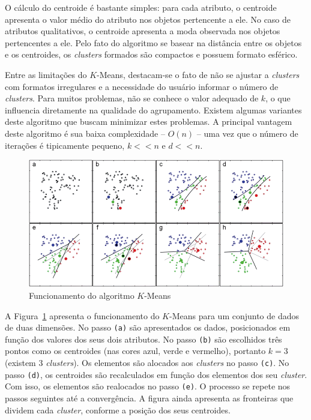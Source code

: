 O cálculo do centroide é bastante simples: para cada atributo, o centroide apresenta o valor médio do atributo nos objetos pertencente a ele. No caso de atributos qualitativos, o centroide apresenta a moda observada nos objetos pertencentes a ele. Pelo fato do algoritmo se basear na distância entre os objetos e os centroides, os \textit{clusters} formados são compactos e possuem formato esférico.

Entre as limitações do $K$-Means, destacam-se o fato de não se ajustar a \textit{clusters} com formatos irregulares e a necessidade do usuário informar o número de \textit{clusters}. Para muitos problemas, não se conhece o valor adequado de $k$, o que influencia diretamente na qualidade do agrupamento. Existem algumas variantes deste algoritmo que buscam minimizar estes problemas. A principal vantagem deste algoritmo é sua baixa complexidade -- $O(n)$ -- uma vez que o número de iterações é tipicamente pequeno, $k << n$ e $d << n$.

\begin{figure}[h]
	\centering
	\includegraphics[width=\textwidth]{img/funcionamento-k-means}
	\caption{Funcionamento do algoritmo $K$-Means}
	\label{fig:funcionamento-k-means}
\end{figure}

A Figura~\ref{fig:funcionamento-k-means} apresenta o funcionamento do $K$-Means para um conjunto de dados de duas dimensões. No passo \texttt{(a)} são apresentados os dados, posicionados em função dos valores dos seus dois atributos. No passo \texttt{(b)} são escolhidos três pontos como os centroides (nas cores azul, verde e vermelho), portanto $k = 3$ (existem 3 \textit{clusters}). Os elementos são alocados aos \textit{clusters} no passo \texttt{(c)}. No passo \texttt{(d)}, os centroides são recalculados em função dos elementos dos seu \textit{cluster}. Com isso, os elementos são realocados no passo \texttt{(e)}. O processo se repete nos passos seguintes até a convergência. A figura ainda apresenta as fronteiras que dividem cada \textit{cluster}, conforme a posição dos seus centroides.

